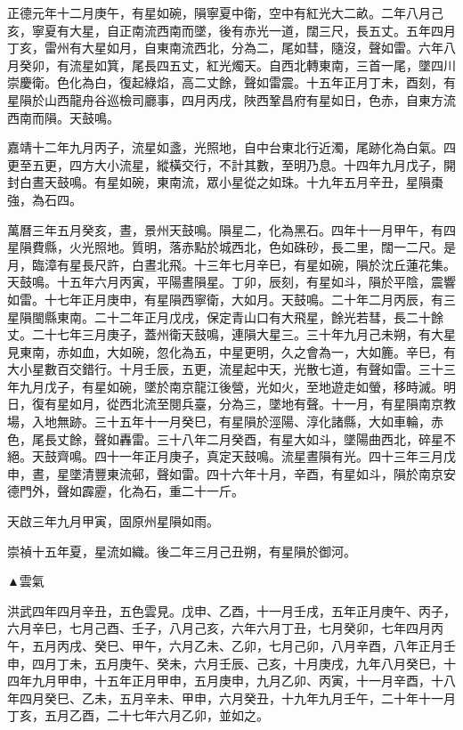 \begin{pinyinscope}
正德元年十二月庚午，有星如碗，隕寧夏中衛，空中有紅光大二畝。二年八月己亥，寧夏有大星，自正南流西南而墜，後有赤光一道，闊三尺，長五丈。五年四月丁亥，雷州有大星如月，自東南流西北，分為二，尾如彗，隨沒，聲如雷。六年八月癸卯，有流星如箕，尾長四五丈，紅光燭天。自西北轉東南，三首一尾，墜四川崇慶衛。色化為白，復起綠焰，高二丈餘，聲如雷震。十五年正月丁未，酉刻，有星隕於山西龍舟谷巡檢司廳事，四月丙戌，陜西鞏昌府有星如日，色赤，自東方流西南而隕。天鼓鳴。

嘉靖十二年九月丙子，流星如盞，光照地，自中台東北行近濁，尾跡化為白氣。四更至五更，四方大小流星，縱橫交行，不計其數，至明乃息。十四年九月戊子，開封白晝天鼓鳴。有星如碗，東南流，眾小星從之如珠。十九年五月辛丑，星隕棗強，為石四。

萬曆三年五月癸亥，晝，景州天鼓鳴。隕星二，化為黑石。四年十一月甲午，有四星隕費縣，火光照地。質明，落赤點於城西北，色如硃砂，長二里，闊一二尺。是月，臨漳有星長尺許，白晝北飛。十三年七月辛巳，有星如碗，隕於沈丘蓮花集。天鼓鳴。十五年六月丙寅，平陽晝隕星。丁卯，辰刻，有星如斗，隕於平陰，震響如雷。十七年正月庚申，有星隕西寧衛，大如月。天鼓鳴。二十年二月丙辰，有三星隕閩縣東南。二十二年正月戊戌，保定青山口有大飛星，餘光若彗，長二十餘丈。二十七年三月庚子，蓋州衛天鼓鳴，連隕大星三。三十年九月己未朔，有大星見東南，赤如血，大如碗，忽化為五，中星更明，久之會為一，大如簏。辛巳，有大小星數百交錯行。十月壬辰，五更，流星起中天，光散七道，有聲如雷。三十三年九月戊子，有星如碗，墜於南京龍江後營，光如火，至地遊走如螢，移時滅。明日，復有星如月，從西北流至閱兵臺，分為三，墜地有聲。十一月，有星隕南京教場，入地無跡。三十五年十一月癸巳，有星隕於涇陽、淳化諸縣，大如車輪，赤色，尾長丈餘，聲如轟雷。三十八年二月癸酉，有星大如斗，墜陽曲西北，碎星不絕。天鼓齊鳴。四十一年正月庚子，真定天鼓鳴。流星晝隕有光。四十三年三月戊申，晝，星墜清豐東流邨，聲如雷。四十六年十月，辛酉，有星如斗，隕於南京安德門外，聲如霹靂，化為石，重二十一斤。

天啟三年九月甲寅，固原州星隕如雨。

崇禎十五年夏，星流如織。後二年三月己丑朔，有星隕於御河。

▲雲氣

洪武四年四月辛丑，五色雲見。戊申、乙酉，十一月壬戌，五年正月庚午、丙子，六月辛巳，七月己酉、壬子，八月己亥，六年六月丁丑，七月癸卯，七年四月丙午，五月丙戌、癸巳、甲午，六月乙未、乙卯，七月己卯，八月辛酉，八年正月壬申，四月丁未，五月庚午、癸未，六月壬辰、己亥，十月庚戌，九年八月癸巳，十四年九月甲申，十五年正月甲申，五月庚申，九月乙卯、丙寅，十一月辛酉，十八年四月癸巳、乙未，五月辛未、甲申，六月癸丑，十九年九月壬午，二十年十一月丁亥，五月乙酉，二十七年六月乙卯，並如之。


\end{pinyinscope}

